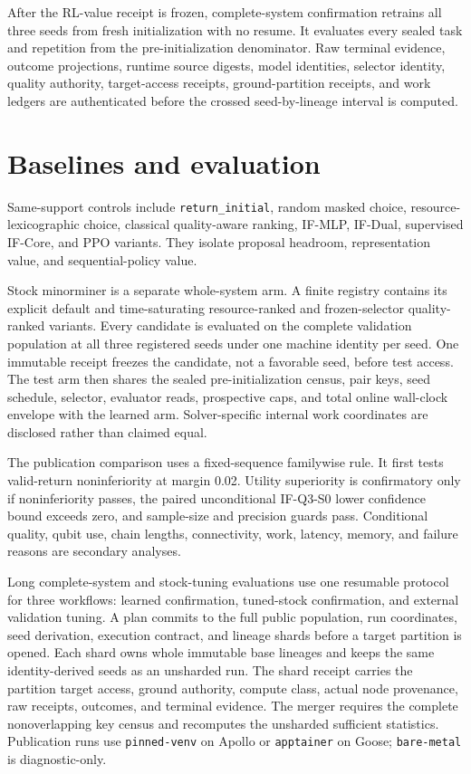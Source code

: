 \documentclass[
  american,
  10pt,
  a4paper,
]{article}
\begin{document}
After the RL-value receipt is frozen, complete-system confirmation
retrains all three seeds from fresh initialization with no resume. It
evaluates every sealed task and repetition from the pre-initialization
denominator. Raw terminal evidence, outcome projections, runtime source
digests, model identities, selector identity, quality authority,
target-access receipts, ground-partition receipts, and work ledgers are
authenticated before the crossed seed-by-lineage interval is computed.

\section{Baselines and evaluation}\label{baselines-and-evaluation}

Same-support controls include \texttt{return\_initial}, random masked
choice, resource-lexicographic choice, classical quality-aware ranking,
IF-MLP, IF-Dual, supervised IF-Core, and PPO variants. They isolate
proposal headroom, representation value, and sequential-policy value.

Stock minorminer is a separate whole-system arm. A finite registry
contains its explicit default and time-saturating resource-ranked and
frozen-selector quality-ranked variants. Every candidate is evaluated on
the complete validation population at all three registered seeds under
one machine identity per seed. One immutable receipt freezes the
candidate, not a favorable seed, before test access. The test arm then
shares the sealed pre-initialization census, pair keys, seed schedule,
selector, evaluator reads, prospective caps, and total online wall-clock
envelope with the learned arm. Solver-specific internal work coordinates
are disclosed rather than claimed equal.

The publication comparison uses a fixed-sequence familywise rule. It
first tests valid-return noninferiority at margin 0.02. Utility
superiority is confirmatory only if noninferiority passes, the paired
unconditional IF-Q3-S0 lower confidence bound exceeds zero, and
sample-size and precision guards pass. Conditional quality, qubit use,
chain lengths, connectivity, work, latency, memory, and failure reasons
are secondary analyses.

Long complete-system and stock-tuning evaluations use one resumable
protocol for three workflows: learned confirmation, tuned-stock
confirmation, and external validation tuning. A plan commits to the full
public population, run coordinates, seed derivation, execution contract,
and lineage shards before a target partition is opened. Each shard owns
whole immutable base lineages and keeps the same identity-derived seeds
as an unsharded run. The shard receipt carries the partition target
access, ground authority, compute class, actual node provenance, raw
receipts, outcomes, and terminal evidence. The merger requires the
complete nonoverlapping key census and recomputes the unsharded
sufficient statistics. Publication runs use \texttt{pinned-venv} on
Apollo or \texttt{apptainer} on Goose; \texttt{bare-metal} is
diagnostic-only.
\end{document}
